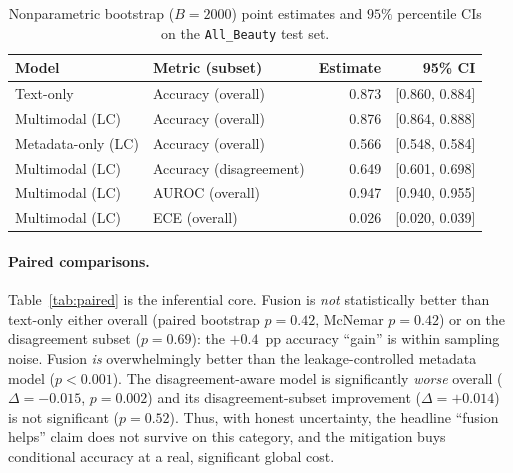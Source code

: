 \documentclass[11pt,a4paper]{article}
\begin{document}
\begin{table}[t]
\centering
\caption{Nonparametric bootstrap ($B=2000$) point estimates and $95\%$
percentile CIs on the \texttt{All\_Beauty} test set.}
\label{tab:ci}
\begin{tabular}{llrr}
\toprule
Model & Metric (subset) & Estimate & 95\% CI \\
\midrule
Text-only          & Accuracy (overall)      & 0.873 & [0.860, 0.884] \\
Multimodal (LC)    & Accuracy (overall)      & 0.876 & [0.864, 0.888] \\
Metadata-only (LC) & Accuracy (overall)      & 0.566 & [0.548, 0.584] \\
Multimodal (LC)    & Accuracy (disagreement) & 0.649 & [0.601, 0.698] \\
Multimodal (LC)    & AUROC (overall)         & 0.947 & [0.940, 0.955] \\
Multimodal (LC)    & ECE (overall)           & 0.026 & [0.020, 0.039] \\
\bottomrule
\end{tabular}
\end{table}

\paragraph{Paired comparisons.}
Table~\ref{tab:paired} is the inferential core. Fusion is \emph{not}
statistically better than text-only either overall (paired bootstrap $p=0.42$,
McNemar $p=0.42$) or on the disagreement subset ($p=0.69$): the $+0.4$~pp
accuracy ``gain'' is within sampling noise. Fusion \emph{is} overwhelmingly
better than the leakage-controlled metadata model ($p<0.001$). The
disagreement-aware model is significantly \emph{worse} overall ($\Delta=-0.015$,
$p=0.002$) and its disagreement-subset improvement ($\Delta=+0.014$) is not
significant ($p=0.52$). Thus, with honest uncertainty, the headline ``fusion
helps'' claim does not survive on this category, and the mitigation buys
conditional accuracy at a real, significant global cost.
\end{document}
